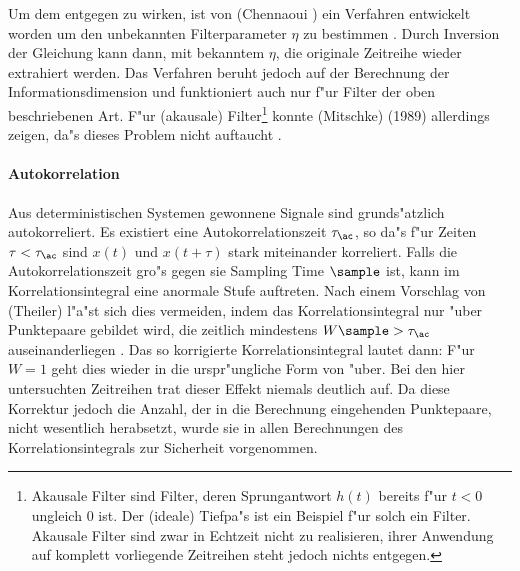 Um dem entgegen zu wirken, ist von \autor(Chennaoui \etal) ein Verfahren entwickelt worden 
um den unbekannten Filterparameter $\eta$ zu bestimmen \cite{Chennaoui}. Durch Inversion der Gleichung
 kann dann, mit bekanntem $\eta$, die originale Zeitreihe wieder
extrahiert werden. Das Verfahren beruht jedoch auf der Berechnung der
Informationsdimension und funktioniert auch nur f"ur Filter der oben beschriebenen
Art. F"ur \begriff(akausale) Filter\footnote{Akausale Filter sind Filter, deren
Sprungantwort $h(t)$ bereits f"ur $t<0$ ungleich 0 ist. Der \begriff(ideale) Tiefpa"s
ist ein Beispiel f"ur solch ein Filter. Akausale Filter sind zwar in Echtzeit nicht zu
realisieren, ihrer Anwendung auf komplett vorliegende Zeitreihen steht jedoch nichts
entgegen.} konnte \autor(Mitschke) (1989) allerdings zeigen, da"s dieses Problem nicht 
auftaucht \cite{Mitschke}.

\paragraph{Autokorrelation}
\label{corrdimtheiler}
Aus deterministischen Systemen gewonnene Signale sind grunds"atzlich autokorreliert. Es
existiert eine Autokorrelationszeit $\tau_\ac$, so da"s f"ur Zeiten $\tau<\tau_\ac$ sind
$x(t)$ und $x(t+\tau)$ stark miteinander korreliert. Falls die Autokorrelationszeit gro"s 
gegen sie Sampling Time $\sample$ ist, kann im Korrelationsintegral eine anormale Stufe
auftreten. Nach einem Vorschlag von \autor(Theiler) l"a"st sich dies vermeiden, indem das
Korrelationsintegral nur "uber Punktepaare  gebildet wird, die zeitlich mindestens
$W\sample>\tau_\ac$ auseinanderliegen \cite{Theiler}. Das so korrigierte Korrelationsintegral lautet dann:
F"ur $W=1$ geht dies wieder in die urspr"ungliche Form von  "uber. Bei
den hier untersuchten Zeitreihen trat dieser Effekt niemals deutlich auf. Da diese
Korrektur jedoch die Anzahl, der in die Berechnung eingehenden Punktepaare, nicht
wesentlich herabsetzt, wurde sie in allen Berechnungen des Korrelationsintegrals zur
Sicherheit vorgenommen.

